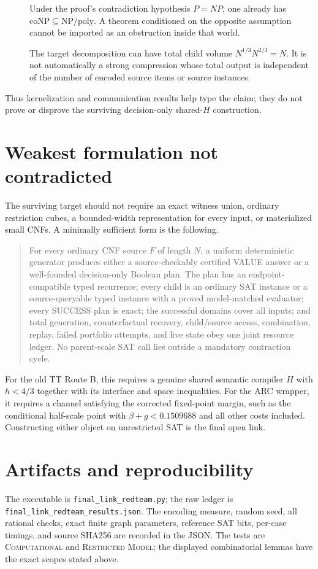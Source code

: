 \documentclass[11pt]{article}
\newcommand{\poly}{\mathrm{poly}}
\begin{document}
\begin{description}
\item[] Under the proof's contradiction hypothesis $P=NP$, one already has
$\mathrm{coNP}\subseteq\mathrm{NP}/\poly$.  A theorem conditioned on the
opposite assumption cannot be imported as an obstruction inside that world.
\item[] The target decomposition can have total child volume
$N^{1/3}N^{2/3}=N$.  It is not automatically a strong compression whose total
output is independent of the number of encoded source items or source
instances.
\end{description}

Thus kernelization and communication results help type the claim; they do not
prove or disprove the surviving decision-only shared-$H$ construction.

\section{Weakest formulation not contradicted}
The surviving target should not require an exact witness union, ordinary
restriction cubes, a bounded-width representation for every input, or
materialized small CNFs.  A minimally sufficient form is the following.

\begin{quote}
For every ordinary CNF source $F$ of length $N$, a uniform deterministic
generator produces either a source-checkably certified VALUE answer or a
well-founded decision-only Boolean plan.  The plan has an endpoint-compatible
typed recurrence; every child is an ordinary SAT instance or a source-queryable
typed instance with a proved model-matched evaluator; every SUCCESS plan is
exact; the successful domains cover all inputs; and total generation,
counterfactual recovery, child/source access, combination, replay, failed
portfolio attempts, and live state obey one joint resource ledger.  No
parent-scale SAT call lies outside a mandatory contraction cycle.
\end{quote}

For the old TT Route B, this requires a genuine shared semantic compiler
$H$ with $h<4/3$ together with its interface and space inequalities.  For the
ARC wrapper, it requires a channel satisfying the corrected fixed-point
margin, such as the conditional half-scale point with $\beta+g<0.1509688$ and
all other costs included.  Constructing either object on unrestricted SAT is
the final open link.

\section{Artifacts and reproducibility}
The executable is \texttt{final\_link\_redteam.py}; the raw ledger is
\texttt{final\_link\_redteam\_results.json}.  The encoding measure, random
seed, all rational checks, exact finite graph parameters, reference SAT bits,
per-case timings, and source SHA256 are recorded in the JSON.  The tests are
\textsc{Computational} and \textsc{Restricted Model}; the displayed
combinatorial lemmas
have the exact scopes stated above.
\end{document}

